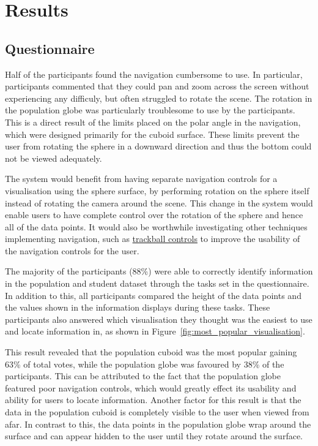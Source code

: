 \section{Results} {
\label{sec:results}

	\subsection{Questionnaire} {
	\label{sec:questionnaire}

		Half of the participants found the navigation cumbersome to use. In particular, participants commented that they could pan and zoom across the screen without experiencing any difficuly, but often struggled to rotate the scene. The rotation in the population globe was particularly troublesome to use by the participants. This is a direct result of the limits placed on the polar angle in the navigation, which were designed primarily for the cuboid surface. These limits prevent the user from rotating the sphere in a downward direction and thus the bottom could not be viewed adequately. 

		The system would benefit from having separate navigation controls for a visualisation using the sphere surface, by performing rotation on the sphere itself instead of rotating the camera around the scene. This change in the system would enable users to have complete control over the rotation of the sphere and hence all of the data points. It would also be worthwhile investigating other techniques implementing navigation, such as \href{http://threejs.org/examples/misc_controls_trackball.html}{trackball controls} to improve the usability of the navigation controls for the user.

		The majority of the participants (88\%) were able to correctly identify information in the population and student dataset through the tasks set in the questionnaire. In addition to this, all participants compared the height of the data points and the values shown in the information displays during these tasks. These participants also answered which visualisation they thought was the easiest to use and locate information in, as shown in Figure~\ref{fig:most_popular_visualisation}. 

		

		This result revealed that the population cuboid was the most popular gaining 63\% of total votes, while the population globe was favoured by 38\% of the participants. This can be attributed to the fact that the population globe featured poor navigation controls, which would greatly effect its usability and ability for users to locate information. Another factor for this result is that the data in the population cuboid is completely visible to the user when viewed from afar. In contrast to this, the data points in the population globe wrap around the surface and can appear hidden to the user until they rotate around the surface. 

}}
